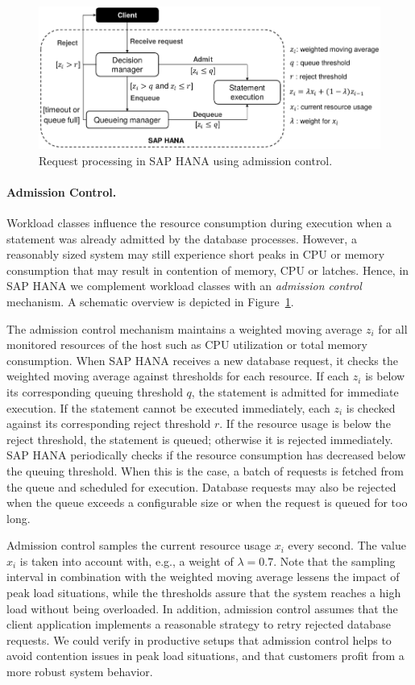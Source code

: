 \documentclass[11pt,dvipdfm]{article}
\begin{document}
\begin{figure}
\centering
\includegraphics[bb=0 0 427 178]{figs/figure2.pdf}
\caption{Request processing in SAP HANA using admission control.}
\label{nollhrm19:fig:hana_admission_control}
\end{figure}

\paragraph{Admission Control.}
Workload classes influence the resource consumption during execution when a statement was already admitted by the database processes.
However, a reasonably sized system may still experience short peaks in CPU or memory consumption that may result in contention of memory, CPU or latches.
Hence, in SAP HANA we complement workload classes with an \emph{admission control} mechanism.
A schematic overview is depicted in Figure~\ref{nollhrm19:fig:hana_admission_control}.

The admission control mechanism maintains a weighted moving average $z_i$ for all monitored resources of the host such as CPU utilization or total memory consumption.
When SAP HANA receives a new database request, it checks the weighted moving average against thresholds for each resource.
If each $z_i$ is below its corresponding queuing threshold $q$, the statement is admitted for immediate execution.
If the statement cannot be executed immediately, each $z_i$ is checked against its corresponding reject threshold $r$.
If the resource usage is below the reject threshold, the statement is queued; otherwise it is rejected immediately.
SAP HANA periodically checks if the resource consumption has decreased below the queuing threshold.
When this is the case, a batch of requests is fetched from the queue and scheduled for execution.
Database requests may also be rejected when the queue exceeds a configurable size or when the request is queued for too long.

Admission control samples the current resource usage $x_i$ every second.
The value $x_i$ is taken into account with, e.g., a weight of $\lambda = 0.7$.
Note that the sampling interval in combination with the weighted moving average lessens the impact of peak load situations, while the thresholds assure that the system reaches a high load without being overloaded.
In addition, admission control assumes that the client application implements a reasonable strategy to retry rejected database requests.
We could verify in productive setups that admission control helps to avoid contention issues in peak load situations, and that customers profit from a more robust system behavior.
\end{document}
